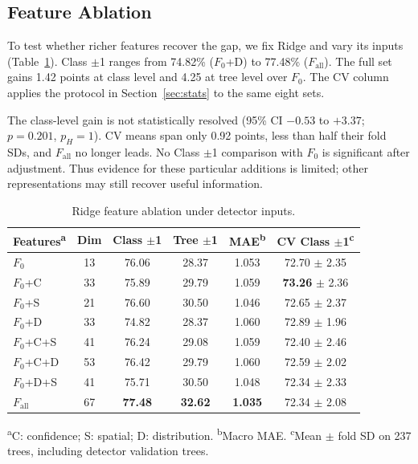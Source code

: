 \documentclass[conference,a4paper]{IEEEtran}
\begin{document}
\subsection{Feature Ablation}
\label{sec:ablation}
To test whether richer features recover the gap, we fix Ridge and vary its
inputs (Table~\ref{tab:ablation}). Class $\pm$1 ranges from 74.82\% ($F_0$+D)
to 77.48\% ($F_{\text{all}}$). The full set gains 1.42 points at class level
and 4.25 at tree level over $F_0$. The CV column applies the protocol in
Section~\ref{sec:stats} to the same eight sets.

The class-level gain is not statistically resolved (95\% CI $-0.53$ to
$+3.37$; $p=0.201$, $p_H=1$). CV means span only 0.92 points, less than half
their fold SDs, and $F_{\text{all}}$ no longer leads. No Class $\pm$1 comparison
with $F_0$ is significant after adjustment. Thus evidence for these particular
additions is limited; other representations may still recover useful information.

\begin{table}[!tb]
  \centering
  \footnotesize
  \renewcommand{\arraystretch}{1.13}
  \setlength{\tabcolsep}{3pt}
  \caption{Ridge feature ablation under detector inputs.}
  \label{tab:ablation}
  \begin{tabular*}{\columnwidth}{@{\extracolsep{\fill}}lccccc@{}}
    \toprule
    Features\textsuperscript{a} & Dim & Class $\pm$1 & Tree $\pm$1 & MAE\textsuperscript{b} & CV Class $\pm$1\textsuperscript{c} \\
    \midrule
    $F_0$        & 13 & 76.06          & 28.37          & 1.053          & 72.70 $\pm$ 2.35 \\
    $F_0$+C      & 33 & 75.89          & 29.79          & 1.059          & \textbf{73.26} $\pm$ 2.36 \\
    $F_0$+S      & 21 & 76.60          & 30.50          & 1.046          & 72.65 $\pm$ 2.37 \\
    $F_0$+D      & 33 & 74.82          & 28.37          & 1.060          & 72.89 $\pm$ 1.96 \\
    $F_0$+C+S    & 41 & 76.24          & 29.08          & 1.059          & 72.40 $\pm$ 2.46 \\
    $F_0$+C+D    & 53 & 76.42          & 29.79          & 1.060          & 72.59 $\pm$ 2.02 \\
    $F_0$+D+S    & 41 & 75.71          & 30.50          & 1.048          & 72.34 $\pm$ 2.33 \\
    $F_{\text{all}}$ & 67 & \textbf{77.48} & \textbf{32.62} & \textbf{1.035} & 72.34 $\pm$ 2.08 \\
    \bottomrule
  \end{tabular*}
\par\vspace{1pt}
  \begin{minipage}{\columnwidth}
    \footnotesize\raggedright
    \textsuperscript{a}C: confidence; S: spatial; D: distribution. \textsuperscript{b}Macro MAE. \textsuperscript{c}Mean $\pm$ fold SD on 237 trees, including detector validation trees.
  \end{minipage}
\end{table}
\end{document}
